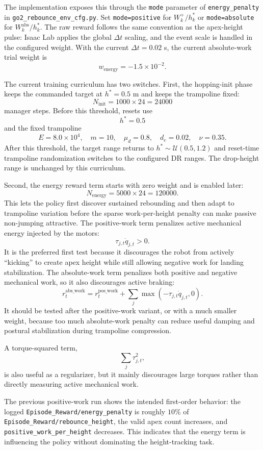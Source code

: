 \documentclass[11pt, a4paper]{article}
\begin{document}
The implementation exposes this through the \texttt{mode} parameter of
\texttt{energy\_penalty} in \texttt{go2\_rebounce\_env\_cfg.py}. Set
\texttt{mode=positive} for $W^{+}_k/h^{*}_k$ or
\texttt{mode=absolute} for $W^{\mathrm{abs}}_k/h^{*}_k$. The raw reward follows
the same convention as the apex-height pulse: Isaac Lab applies the global
$\Delta t$ scaling, and the event scale is handled in the configured weight.
With the current $\Delta t=0.02$ s, the current absolute-work trial weight is
\[
    w_{\mathrm{energy}} = -1.5\times10^{-2}.
\]

The current training curriculum has two switches. First, the hopping-init phase
keeps the commanded target at $h^*=0.5$ m and keeps the trampoline fixed:
\[
    N_{\mathrm{init}} = 1000 \times 24 = 24000
\]
manager steps. Before this threshold, resets use
\[
    h^*=0.5
\]
and the fixed trampoline
\[
    E=8.0\times10^4,\quad
    m=10,\quad
    \mu_d=0.8,\quad
    d_e=0.02,\quad
    \nu=0.35.
\]
After this threshold, the target range returns to
$h^*\sim\mathcal{U}(0.5,1.2)$ and reset-time trampoline randomization switches
to the configured DR ranges. The drop-height range is unchanged by this
curriculum.

Second, the energy reward term starts with zero weight and is enabled later:
\[
    N_{\mathrm{energy}} = 5000 \times 24 = 120000.
\]
This lets the policy first discover sustained rebounding and then adapt to
trampoline variation before the sparse work-per-height penalty can make passive
non-jumping attractive.
The positive-work term penalizes active mechanical energy injected by the
motors:
\[
    \tau_{j,t}\dot{q}_{j,t} > 0.
\]
It is the preferred first test because it discourages the robot from actively
``kicking'' to create apex height while still allowing negative work for
landing stabilization. The absolute-work term penalizes both positive and
negative mechanical work, so it also discourages active braking:
\[
    r^{\mathrm{abs\_work}}_t
    =
    r^{\mathrm{pos\_work}}_t
    +
    \sum_j \max(-\tau_{j,t}\dot{q}_{j,t},0).
\]
It should be tested after the positive-work variant, or with a much smaller
weight, because too much absolute-work penalty can reduce useful damping and
postural stabilization during trampoline compression.

A torque-squared term,
\[
    \sum_j \tau_{j,t}^{2},
\]
is also useful as a regularizer, but it mainly discourages large torques rather
than directly measuring active mechanical work.

The previous positive-work run shows the intended first-order behavior: the
logged \texttt{Episode\_Reward/energy\_penalty} is roughly $10\%$ of
\texttt{Episode\_Reward/rebounce\_height}, the valid apex count increases, and
\texttt{positive\_work\_per\_height} decreases. This indicates that the energy
term is influencing the policy without dominating the height-tracking task.
\end{document}
